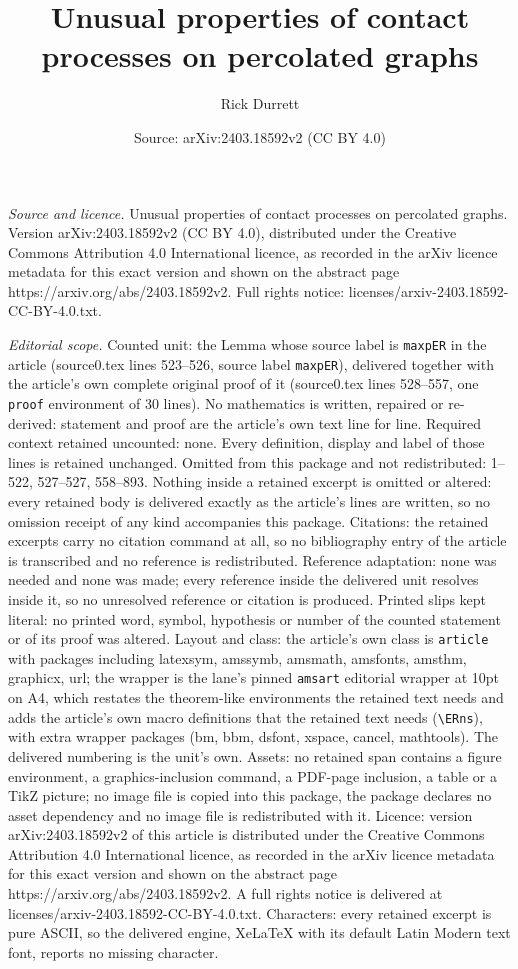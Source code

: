 \documentclass[10pt,a4paper]{amsart}
\title[Unusual properties of contact processes on percolated graphs]{Unusual properties of contact processes on percolated graphs}
\author{Rick Durrett}
\date{Source: arXiv:2403.18592v2 (CC BY 4.0)}
\begin{document}
\maketitle

\noindent\emph{Source and licence.} Unusual properties of contact processes on percolated graphs. Version arXiv:2403.18592v2 (CC BY 4.0), distributed under the Creative Commons Attribution 4.0 International licence, as recorded in the arXiv licence metadata for this exact version and shown on the abstract page https://arxiv.org/abs/2403.18592v2. Full rights notice: licenses/arxiv-2403.18592-CC-BY-4.0.txt.\par\smallskip

\noindent\textit{Editorial scope.} Counted unit: the Lemma whose source label is \texttt{maxpER} in the article (source0.tex lines 523--526, source label \texttt{maxpER}), delivered together with the article's own complete original proof of it (source0.tex lines 528--557, one \texttt{proof} environment of 30 lines). No mathematics is written, repaired or re-derived: statement and proof are the article's own text line for line. Required context retained uncounted: none. Every definition, display and label of those lines is retained unchanged. Omitted from this package and not redistributed: 1--522, 527--527, 558--893. Nothing inside a retained excerpt is omitted or altered: every retained body is delivered exactly as the article's lines are written, so no omission receipt of any kind accompanies this package. Citations: the retained excerpts carry no citation command at all, so no bibliography entry of the article is transcribed and no reference is redistributed. Reference adaptation: none was needed and none was made; every reference inside the delivered unit resolves inside it, so no unresolved reference or citation is produced. Printed slips kept literal: no printed word, symbol, hypothesis or number of the counted statement or of its proof was altered. Layout and class: the article's own class is \texttt{article} with packages including latexsym, amssymb, amsmath, amsfonts, amsthm, graphicx, url; the wrapper is the lane's pinned \texttt{amsart} editorial wrapper at 10pt on A4, which restates the theorem-like environments the retained text needs and adds the article's own macro definitions that the retained text needs (\texttt{\textbackslash ERns}), with extra wrapper packages (bm, bbm, dsfont, xspace, cancel, mathtools). The delivered numbering is the unit's own. Assets: no retained span contains a figure environment, a graphics-inclusion command, a PDF-page inclusion, a table or a TikZ picture; no image file is copied into this package, the package declares no asset dependency and no image file is redistributed with it. Licence: version arXiv:2403.18592v2 of this article is distributed under the Creative Commons Attribution 4.0 International licence, as recorded in the arXiv licence metadata for this exact version and shown on the abstract page https://arxiv.org/abs/2403.18592v2. A full rights notice is delivered at licenses/arxiv-2403.18592-CC-BY-4.0.txt. Characters: every retained excerpt is pure ASCII, so the delivered engine, XeLaTeX with its default Latin Modern text font, reports no missing character.
\end{document}
